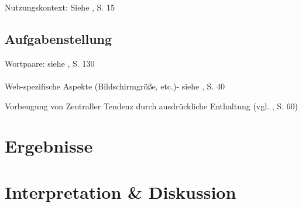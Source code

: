 \documentclass[Bachelorarbeit.tex]{subfiles}
\begin{document}
Nutzungskontext: Siehe \cite{Ollermann2007}, S. 15



\subsection{Aufgabenstellung}
\label{Aufgabenstellung}

Wortpaare: siehe \cite{Laugwitz2006}, S. 130 \\
\\
Web-spezifische Aspekte (Bildschirmgröße, etc.)- siehe \cite{Ollermann2007}, S. 40

Vorbeugung von Zentraller Tendenz durch ausdrückliche Enthaltung (vgl. \cite{Ollermann2007}, S. 60)

\section{Ergebnisse}
\label{Ergebnisse}

\section{Interpretation \& Diskussion}
\label{InterpretationDiskussion}
\end{document}
